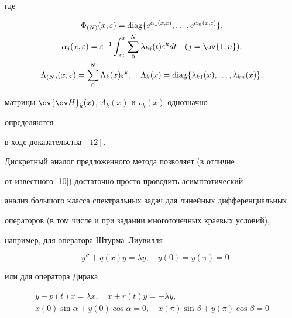 \begin{thm}
где 


\begin{gather*} 


\Phi_{(N)}(x,\varepsilon)=\diag\{e^{\alpha_1(x,\varepsilon)} 


,\dotsc,e^{\alpha_n(x,\varepsilon)}\},\\ 


\alpha_j(x,\varepsilon)=\varepsilon^{-1}\int^x_{x_j} 


\sum^N_0 \lambda_{kj}(t)\varepsilon^k dt\quad (j=\ov{1,n}),\\ 


\Lambda_{(N)}(x,\varepsilon)=\sum^N_0 


\Lambda_k(x)\varepsilon^k,\quad 


\Lambda_k(x)=\diag\{\lambda_{k1}(x),\dotsc,\lambda_{kn}(x)\}, 


\end{gather*} 


матрицы $\ov{\ov H}_k(x)$, $\Lambda_k(x)$ и $v_k(x)$ однозначно 


определяются 


в ходе доказательства $[12]$. 


\end{thm} 


 


Дискретный аналог предложенного метода позволяет (в отличие 


от известного [10]) достаточно просто проводить асимптотический 


анализ большого класса спектральных задач для линейных дифференциальных 


операторов (в том числе и при задании многоточечных краевых условий), 


например, для оператора Штурма--Лиувилля 


\begin{equation} 


-y''+q(x)y=\lambda y,\quad 


y(0)=y(\pi)=0


\end{equation} 


или для оператора Дирака 


\begin{equation} 


\begin{array}{c} 


\Dot y-p(t)x=\lambda x,\quad \Dot x+r(t)y=-\lambda y,\\[2mm] 


x(0)\sin\alpha+y(0)\cos\alpha=0,\quad 


x(\pi)\sin\beta+y(\pi)\cos\beta=0 


\end{array} 


\end{equation} 


